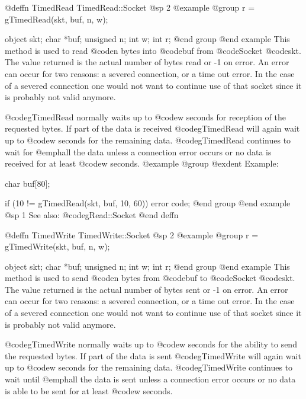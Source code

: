 @deffn {TimedRead} TimedRead::Socket
@sp 2
@example
@group
r = gTimedRead(skt, buf, n, w);

object   skt;
char     *buf;
unsigned n;
int      w;
int      r;
@end group
@end example
This method is used to read @code{n} bytes into @code{buf} from
@code{Socket} @code{skt}.  The value returned is the actual number
of bytes read or -1 on error.  An error can occur for two reasons:
a severed connection, or a time out error.  In the case of a severed
connection one would not want to continue use of that socket since
it is probably not valid anymore.

@code{gTimedRead} normally waits up to @code{w} seconds for reception of the
requested bytes.  If part of the data is received @code{gTimedRead}
will again wait up to @code{w} seconds for the remaining data.  @code{gTimedRead}
continues to wait for @emph{all} the data unless a connection error
occurs or no data is received for at least @code{w} seconds.
@example
@group
@exdent Example:
 
char    buf[80];

if (10 != gTimedRead(skt, buf, 10, 60))
        error code;
@end group
@end example
@sp 1
See also:  @code{gRead::Socket}
@end deffn



















@deffn {TimedWrite} TimedWrite::Socket
@sp 2
@example
@group
r = gTimedWrite(skt, buf, n, w);

object   skt;
char     *buf;
unsigned n;
int      w;
int      r;
@end group
@end example
This method is used to send @code{n} bytes from @code{buf} to
@code{Socket} @code{skt}.  The value returned is the actual number
of bytes sent or -1 on error.  An error can occur for two reasons:
a severed connection, or a time out error.  In the case of a severed
connection one would not want to continue use of that socket since
it is probably not valid anymore.

@code{gTimedWrite} normally waits up to @code{w} seconds for the ability to send the
requested bytes.  If part of the data is sent @code{gTimedWrite} will again
wait up to @code{w} seconds for the remaining data.  @code{gTimedWrite} continues to
wait until @emph{all} the data is sent unless a connection error occurs
or no data is able to be sent for at least @code{w} seconds.

